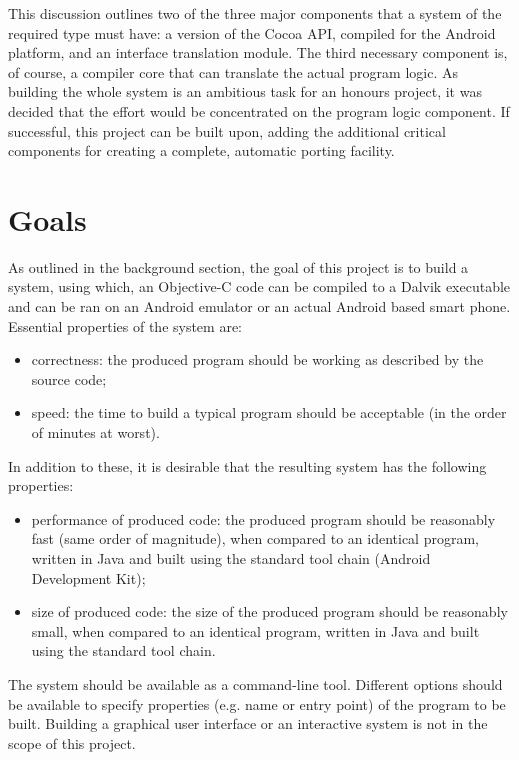 \documentclass[parskip]{cs4rep}
\begin{document}
This discussion outlines two of the three major components that a system of the required type must have: a version of the Cocoa API, compiled for the Android platform, and an interface translation module. The third necessary component is, of course, a compiler core that can translate the actual program logic. As building the whole system is an ambitious task for an honours project, it was decided that the effort would be concentrated on the program logic component. If successful, this project can be built upon, adding the additional critical components for creating a complete, automatic porting facility.

\section{Goals}

As outlined in the background section, the goal of this project is to build a system, using which, an Objective-C code can be compiled to a Dalvik executable and can be ran on an Android emulator or an actual Android based smart phone. Essential properties of the system are:
\begin{itemize}
\item
correctness: the produced program should be working as described by the source code;
\item
speed: the time to build a typical program should be acceptable (in the order of minutes at worst).
\end{itemize}

In addition to these, it is desirable that the resulting system has the following properties:

\begin{itemize}
\item
performance of produced code: the produced program should be reasonably fast (same order of magnitude), when compared to an identical program, written in Java and built using the standard tool chain (Android Development Kit);
\item
size of produced code: the size of the produced program should be reasonably small, when compared to an identical program, written in Java and built using the standard tool chain.
\end{itemize}

The system should be available as a command-line tool. Different options should be available to specify properties (e.g. name or entry point) of the program to be built. Building a graphical user interface or an interactive system is not in the scope of this project.
\end{document}
